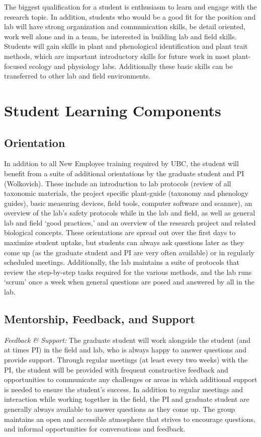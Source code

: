 \documentclass[11pt, oneside]{article}   	%
\begin{document}
The biggest qualification for a student is enthusiasm to learn and engage with the research topic. In addition, students who would be a good fit for the position and lab will have strong organization and communication skills, be detail oriented, work well alone and in a team, be interested in building lab and field skills. Students will gain skills in plant and phenological identification and plant trait methods, which are important introductory skills for future work in most plant-focused ecology and physiology labs. Additionally these basic skills can be transferred to other lab and field environments. 

\section {Student Learning Components}

\subsection {Orientation}
In addition to all New Employee training required by UBC, the student will benefit from a suite of additional orientations by the graduate student and PI (Wolkovich). These include an introduction to lab protocols (review of all taxonomic materials, the project specific plant-guide (taxonomy and phenology guides), basic measuring devices, field tools, computer software and scanner), an overview of the lab's safety protocols while in the lab and field, as well as general lab and field `good practices,' and an overview of the research project and related biological concepts. These orientations are spread out over the first days to maximize student uptake, but students can always ask questions later as they come up (as the graduate student and PI are very often available) or in regularly scheduled meetings. Additionally, the lab maintains a suite of protocols that review the step-by-step tasks required for the various methods, and the lab runs `scrum' once a week when general questions are posed and answered by all in the lab.

\subsection{Mentorship, Feedback, and Support}
\noindent \emph{Feedback \& Support:} The graduate student will work alongside the student (and at times PI) in the field and lab, who is always happy to answer questions and provide support. Through regular meetings (at least every two weeks) with the PI, the student will be provided with frequent constructive feedback and opportunities to communicate any challenges or areas in which additional support is needed to ensure the student's success. In addition to regular meetings and interaction while working together in the field, the PI and graduate student are generally always available to answer questions as they come up. The group maintains an open and accessible atmosphere that strives to encourage questions, and informal opportunities for conversations and feedback.
\end{document}
